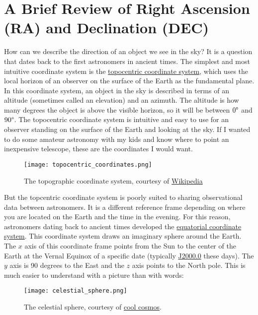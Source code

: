 \section{A Brief Review of Right Ascension (RA) and Declination (DEC)}
\label{section_ra_dec}
How can we describe the direction of an object we see in the sky?
It is a question that dates back to the first astronomers in ancient times.
The simplest and most intuitive coordinate system is the \href{https://en.wikipedia.org/wiki/Horizontal_coordinate_system}{topocentric coordinate system},
which uses the local horizon of an observer on the surface of the Earth as the fundamental plane.
In this coordinate system, an object in the sky is described in terms of an altitude (sometimes called an elevation) and an azimuth.
The altitude is how many degrees the object is above the visible horizon, so it will be between $0 \degree$ and $90 \degree$.
The topocentric coordinate system is intuitive and easy to use for an observer standing on the surface of the Earth and looking at the sky.
If I wanted to do some amateur astronomy with my kids and know where to point an inexpensive telescope, these are the coordinates I would want.
\begin{figure}[hbt!]
\begin{center}
\texttt{[image: topocentric\_coordinates.png]}
\caption{The topographic coordinate system, courtesy of \href{https://en.wikipedia.org/wiki/Horizontal_coordinate_system}{Wikipedia}}
\end{center}
\end{figure}

But the topcentric coordinate system is poorly suited to sharing observational data between astronomers.
It is a different reference frame depending on where you are located on the Earth and the time in the evening.
For this reason, astronomers dating back to ancient times developed the \href{https://en.wikipedia.org/wiki/Equatorial_coordinate_system}{equatorial coordinate system}.
This coordinate system draws an imaginary sphere around the Earth.
The $x$ axis of this coordinate frame points from the Sun to the center of the Earth at the Vernal Equinox of a specific date 
(typically \href{https://en.wikipedia.org/wiki/Epoch_(astronomy)}{J2000.0} these days).
The $y$ axis is 90 degrees to the East and the $z$ axis points to the North pole.
This is much easier to understand with a picture than with words:
\begin{figure}[hbt!]
\begin{center}
\texttt{[image: celestial\_sphere.png]}
\caption{The celestial sphere, courtesy of \href{http://coolcosmos.ipac.caltech.edu/cosmic_classroom/cosmic_reference/coordsys.html}{cool cosmos}.}
\end{center}
\end{figure}

